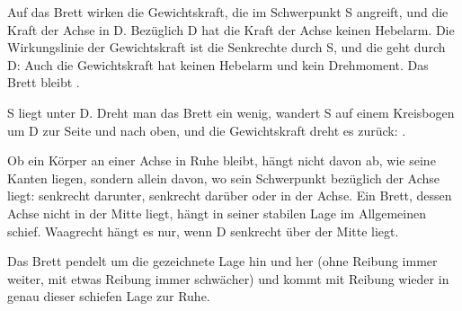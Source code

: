 \begin{abcliste}
\abc
Auf das Brett wirken die Gewichtskraft, die im Schwerpunkt S angreift, und die Kraft der Achse in D. Bezüglich D hat die Kraft der Achse keinen Hebelarm. Die Wirkungslinie der Gewichtskraft ist die Senkrechte durch S, und die geht durch D: Auch die Gewichtskraft hat keinen Hebelarm und kein Drehmoment. Das Brett bleibt .

S liegt unter D. Dreht man das Brett ein wenig, wandert S auf einem Kreisbogen um D zur Seite und nach oben, und die Gewichtskraft dreht es zurück: .

\abc
Ob ein Körper an einer Achse in Ruhe bleibt, hängt nicht davon ab, wie seine Kanten liegen, sondern allein davon, wo sein Schwerpunkt bezüglich der Achse liegt: senkrecht darunter, senkrecht darüber oder in der Achse. Ein Brett, dessen Achse nicht in der Mitte liegt, hängt in seiner stabilen Lage im Allgemeinen schief. Waagrecht hängt es nur, wenn D senkrecht über der Mitte liegt.

\abc
Das Brett pendelt um die gezeichnete Lage hin und her (ohne Reibung immer weiter, mit etwas Reibung immer schwächer) und kommt mit Reibung wieder in genau dieser schiefen Lage zur Ruhe.
\end{abcliste}
